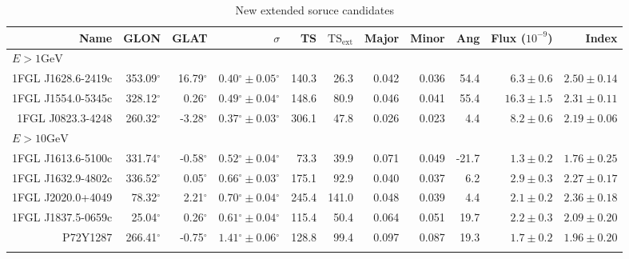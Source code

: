\documentclass[preprint]{aastex}
\newcommand{\gev}{\text{GeV}\xspace}
\newcommand{\tsext}{\ensuremath{\text{TS}_\text{ext}}\xspace}
\renewcommand{\deg}{\ensuremath{^\circ}\xspace}
\begin{document}
\begin{table}
    \begin{centering}
      \begin{tabular}{rrrrrrrrrrr}
        Name               &        GLON &        GLAT  &                $\sigma$ &       TS &   $\tsext$ &  Major &  Minor &    Ang &       Flux ($10^{-9}$) &      Index \\
        \hline
        \multicolumn{11}{l}{$E > 1\gev$} \\
        \hline
        1FGL J1628.6-2419c &   353.09\deg&    16.79\deg & $  0.40\deg\pm0.05\deg$ &    140.3 &       26.3 &  0.042 &  0.036 &   54.4 & $    6.3\pm0.6$ &$   2.50\pm0.14$ \\
        1FGL J1554.0-5345c &   328.12\deg&     0.26\deg & $  0.49\deg\pm0.04\deg$ &    148.6 &       80.9 &  0.046 &  0.041 &   55.4 & $   16.3\pm1.5$ &$   2.31\pm0.11$ \\
        1FGL J0823.3-4248  &   260.32\deg&    -3.28\deg & $  0.37\deg\pm0.03\deg$ &    306.1 &       47.8 &  0.026 &  0.023 &    4.4 & $    8.2\pm0.6$ &$   2.19\pm0.06$ \\
        \hline
        \multicolumn{11}{l}{$E > 10\gev$} \\
        \hline
        1FGL J1613.6-5100c &   331.74\deg&    -0.58\deg & $  0.52\deg\pm0.04\deg$ &     73.3 &       39.9 &  0.071 &  0.049 &  -21.7 & $    1.3\pm0.2$ &$   1.76\pm0.25$ \\
        1FGL J1632.9-4802c &   336.52\deg&     0.05\deg & $  0.66\deg\pm0.03\deg$ &    175.1 &       92.9 &  0.040 &  0.037 &    6.2 & $    2.9\pm0.3$ &$   2.27\pm0.17$ \\
        1FGL J2020.0+4049  &    78.32\deg&     2.21\deg & $  0.70\deg\pm0.04\deg$ &    245.4 &      141.0 &  0.048 &  0.039 &    4.4 & $    2.1\pm0.2$ &$   2.36\pm0.18$ \\
        1FGL J1837.5-0659c &    25.04\deg&     0.26\deg & $  0.61\deg\pm0.04\deg$ &    115.4 &       50.4 &  0.064 &  0.051 &   19.7 & $    2.2\pm0.3$ &$   2.09\pm0.20$ \\
        P72Y1287           &   266.41\deg&    -0.75\deg & $  1.41\deg\pm0.06\deg$ &    128.8 &       99.4 &  0.097 &  0.087 &   19.3 & $    1.7\pm0.2$ &$   1.96\pm0.20$ \\
        \hline
      \label{new_ext_srcs}
      \end{tabular}
      \caption{New extended soruce candidates}
    \end{centering}
\end{table}
\end{document}
